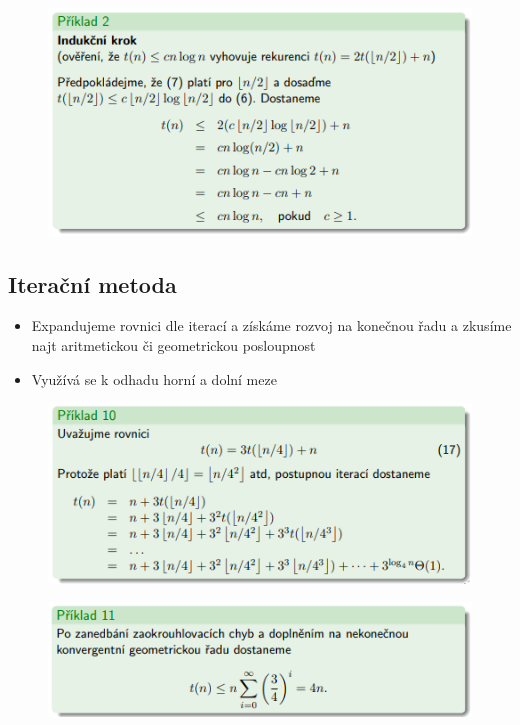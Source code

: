 \documentclass{szzclass}
\begin{document}
\begin{figure}[h]
    \includegraphics[width=\textwidth, center]{topics/bi-spol-32/images/ind2.PNG}
\end{figure}

\newpage
\subsection{Iterační metoda}

\begin{itemize}
    \item Expandujeme rovnici dle iterací a získáme rozvoj na konečnou řadu a zkusíme najt aritmetickou či geometrickou posloupnost
    \item Využívá se k odhadu horní a dolní meze
\end{itemize}


\begin{figure}[h]
    \includegraphics[width=\textwidth, center]{topics/bi-spol-32/images/it1.PNG}
\end{figure}


\begin{figure}[h]
    \includegraphics[width=\textwidth, center]{topics/bi-spol-32/images/it2.PNG}
\end{figure}
\end{document}
